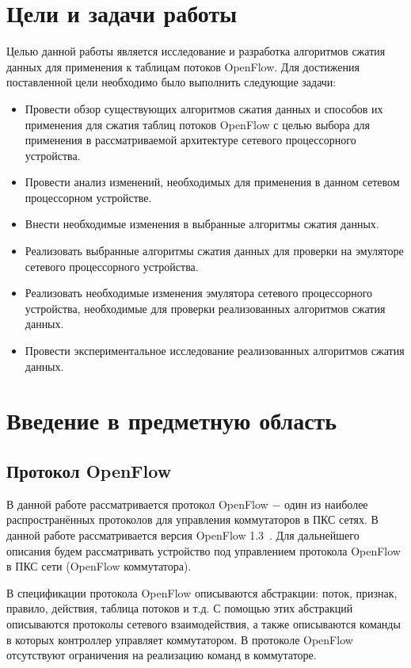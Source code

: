 \documentclass[oneside,final,12pt]{extarticle}
\begin{document}
    \section{Цели и задачи работы}
        Целью данной работы является исследование и разработка алгоритмов сжатия данных для применения к таблицам потоков OpenFlow. Для достижения поставленной цели
        необходимо было выполнить следующие задачи:
        \begin{itemize}
            \item Провести обзор существующих алгоритмов сжатия данных и способов их применения для сжатия таблиц потоков OpenFlow с целью выбора 
                для применения в рассматриваемой архитектуре сетевого процессорного устройства.
            \item Провести анализ изменений, необходимых для применения в данном сетевом процессорном устройстве.
            \item Внести необходимые изменения в выбранные алгоритмы сжатия данных.
            \item Реализовать выбранные алгоритмы сжатия данных для проверки на эмуляторе сетевого процессорного устройства.
            \item Реализовать необходимые изменения эмулятора сетевого процессорного устройства, необходимые для проверки реализованных алгоритмов
                сжатия данных.
            \item Провести экспериментальное исследование реализованных алгоритмов сжатия данных.
        \end{itemize}
    \section{Введение в предметную область}
        \subsection{Протокол OpenFlow}
            \label{sect:openflow}
            В данной работе рассматривается протокол OpenFlow $-$ один из наиболее распространённых протоколов для управления коммутаторов в ПКС сетях.
            В данной работе рассматривается версия OpenFlow 1.3~\cite{openflow}. Для дальнейшего описания будем рассматривать устройство под управлением протокола OpenFlow в ПКС сети (OpenFlow коммутатора).

            В спецификации протокола OpenFlow описываются абстракции: поток, признак, правило, действия, таблица потоков и т.д. С помощью этих абстракций описываются
            протоколы сетевого взаимодействия, а также описываются команды в которых контроллер управляет коммутатором. В протоколе OpenFlow отсутствуют ограничения
            на реализацию команд в коммутаторе.
\end{document}
